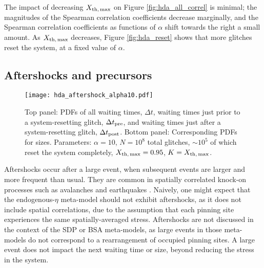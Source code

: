 The impact of decreasing $X_{\rm th,\,max}$ on Figure \ref{fig:hda_all_correl} is minimal; the magnitudes of the Spearman correlation coefficients decrease marginally, and the Spearman correlation coefficients as functions of $\alpha$ shift towards the right a small amount. As $X_{\rm th,\,max}$ decreases, Figure \ref{fig:hda_reset} shows that more glitches reset the system, at a fixed value of $\alpha$.

\subsection{Aftershocks and precursors} \label{sec:hda_aftershock}
\begin{figure}
\centering
\texttt{[image: hda\_aftershock\_alpha10.pdf]}
\caption{Top panel: PDFs of all waiting times, $\Delta t$, waiting times just prior to a system-resetting glitch, $\Delta t_{\rm pre}$, and waiting times just after a system-resetting glitch, $\Delta t_{\rm post}$. Bottom panel: Corresponding PDFs for sizes. Parameters: $\alpha=10$, $N=10^8$ total glitches, $\sim10^5$ of which reset the system completely, $X_{\rm th,\,max}=0.95$, $K=X_{\rm th,\,max}$. \label{fig:hda_aftershocks}}
\end{figure}

Aftershocks occur after a large event, when subsequent events are larger and more frequent than usual. They are common in spatially correlated knock-on processes such as avalanches and earthquakes \citep{Kagan1991, Utsu1995, Jensen1998}. Naively, one might expect that the endogenous-$\eta$ meta-model should not exhibit aftershocks, as it does not include spatial correlations, due to the assumption that each pinning site experiences the same spatially-averaged stress. Aftershocks are not discussed in the context of the SDP or BSA meta-models, as large events in those meta-models do not correspond to a rearrangement of occupied pinning sites. A large event does not impact the next waiting time or size, beyond reducing the stress in the system.

